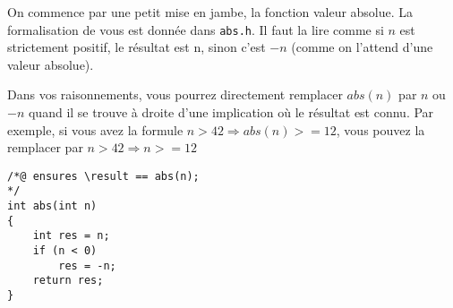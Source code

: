 \documentclass[11pt,answers]{exam}
\begin{document}
\begin{questions}

  
    On commence par une petit mise en jambe, la fonction valeur absolue.
    La formalisation de  vous est donnée dans \texttt{abs.h}. Il faut la lire comme si $n$ est strictement positif, le résultat est n, sinon c’est $-n$ (comme on l’attend d’une valeur absolue).

    Dans vos raisonnements, vous pourrez directement remplacer $abs(n)$ par $n$ ou $-n$ quand il se trouve à droite d’une implication où le résultat est connu. Par exemple, si vous avez la formule $n > 42 \Rightarrow abs(n) >= 12$, vous pouvez la remplacer par $n > 42 \Rightarrow n >= 12$

        \begin{lstlisting}
/*@ ensures \result == abs(n);
*/
int abs(int n)
{
    int res = n;
    if (n < 0)
        res = -n;
    return res;
}
    \end{lstlisting}

\end{questions}
\end{document}
